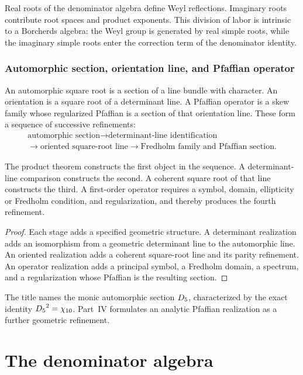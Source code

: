 Real roots of the denominator algebra define Weyl reflections. Imaginary roots contribute root spaces and product exponents. This division of labor is intrinsic to a Borcherds algebra: the Weyl group is generated by real simple roots, while the imaginary simple roots enter the correction term of the denominator identity.

\section{Automorphic section, orientation line, and Pfaffian operator}
An automorphic square root is a section of a line bundle with character. An orientation is a square root of a determinant line. A Pfaffian operator is a skew family whose regularized Pfaffian is a section of that orientation line. These form a sequence of successive refinements:
\[
\begin{gathered}
 \text{automorphic section}
 \longrightarrow \text{determinant-line identification}\\
 \longrightarrow \text{oriented square-root line}
 \longrightarrow \text{Fredholm family and Pfaffian section}.
\end{gathered}
\]

\begin{proposition}
The product theorem constructs the first object in the sequence. A determinant-line comparison constructs the second. A coherent square root of that line constructs the third. A first-order operator requires a symbol, domain, ellipticity or Fredholm condition, and regularization, and thereby produces the fourth refinement.
\end{proposition}
\begin{proof}
Each stage adds a specified geometric structure. A determinant realization adds an isomorphism from a geometric determinant line to the automorphic line. An oriented realization adds a coherent square-root line and its parity refinement. An operator realization adds a principal symbol, a Fredholm domain, a spectrum, and a regularization whose Pfaffian is the resulting section.
\end{proof}

The title names the monic automorphic section ${D_5}$, characterized by the exact identity ${D_5}^2={\chi_{10}}$. Part~IV formulates an analytic Pfaffian realization as a further geometric refinement.

\part{The denominator algebra}

